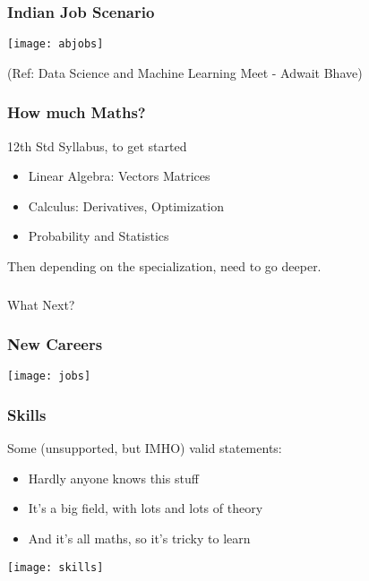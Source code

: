 \begin{frame}[fragile]\frametitle{Indian Job Scenario}
\begin{center}
\texttt{[image: abjobs]}
\end{center}
{\tiny (Ref: Data Science and Machine Learning Meet - Adwait Bhave)}

\end{frame}

\begin{frame}[fragile]\frametitle{How much Maths?}
12th Std Syllabus, to get started
\begin{itemize}
\item Linear Algebra: Vectors Matrices
\item Calculus: Derivatives, Optimization
\item Probability and Statistics
\end{itemize}
Then depending on the specialization, need to go deeper. 
\end{frame}


\begin{frame}[fragile]\frametitle{}
\begin{center}
{\Large What Next?}

\end{center}
\end{frame}



\begin{frame}[fragile]\frametitle{New Careers}
\begin{center}
\texttt{[image: jobs]}
\end{center}
\end{frame}

\begin{frame}[fragile]\frametitle{Skills}
Some (unsupported, but IMHO) valid statements:
	\begin{itemize}
	\item  Hardly anyone knows this stuff
	\item  It's a big field, with lots and lots of theory
	\item  And it's all maths, so it's tricky to learn
	\end{itemize}
\begin{center}
\texttt{[image: skills]}
\end{center}	
\end{frame}

